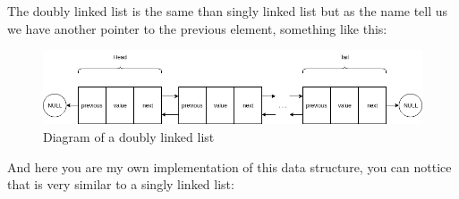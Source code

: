 The doubly linked list is the same than singly linked list but as the name tell us we have another pointer to the previous element, something like this:

\begin{figure}[H]
    \centering
    \includegraphics[width=1.00\textwidth]{Images/DataStructures/LinkedLists/DoublyLinkedList.png}
    \caption{Diagram of a doubly linked list}
    \label{fig:doubly_linked_list_diagram-01}
\end{figure}

And here you are my own implementation of this data structure, you can nottice that is very similar to a singly linked list:

